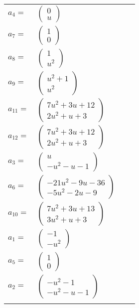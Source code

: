 \documentclass[1p]{elsarticle_modified}
\theoremstyle{definition}
\begin{document}
\begin{tabular}{m{7pt} m{180pt} m{7pt} m{180pt} }
\flushright $a_{4}=$&$\begin{pmatrix}0\\u\end{pmatrix}$ \\
\flushright $a_{7}=$&$\begin{pmatrix}1\\0\end{pmatrix}$ \\
\flushright $a_{8}=$&$\begin{pmatrix}1\\u^2\end{pmatrix}$ \\
\flushright $a_{9}=$&$\begin{pmatrix}u^2+1\\u^2\end{pmatrix}$ \\
\flushright $a_{11}=$&$\begin{pmatrix}7 u^2+3 u+12\\2 u^2+u+3\end{pmatrix}$ \\
\flushright $a_{12}=$&$\begin{pmatrix}7 u^2+3 u+12\\2 u^2+u+3\end{pmatrix}$ \\
\flushright $a_{3}=$&$\begin{pmatrix}u\\- u^2- u-1\end{pmatrix}$ \\
\flushright $a_{6}=$&$\begin{pmatrix}-21 u^2-9 u-36\\-5 u^2-2 u-9\end{pmatrix}$ \\
\flushright $a_{10}=$&$\begin{pmatrix}7 u^2+3 u+13\\3 u^2+u+3\end{pmatrix}$ \\
\flushright $a_{1}=$&$\begin{pmatrix}-1\\- u^2\end{pmatrix}$ \\
\flushright $a_{5}=$&$\begin{pmatrix}1\\0\end{pmatrix}$ \\
\flushright $a_{2}=$&$\begin{pmatrix}- u^2-1\\- u^2- u-1\end{pmatrix}$\\&\end{tabular}
\end{document}
